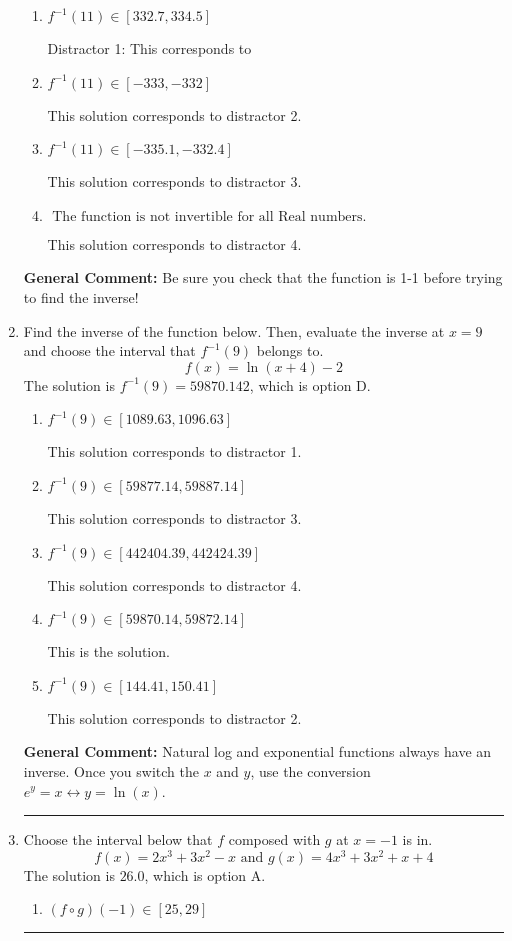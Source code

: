 \documentclass{extbook}[14pt]
\newcommand{\litem}[1]{\item #1

\rule{\textwidth}{0.4pt}}
\begin{document}
\begin{enumerate}
{\begin{enumerate}[label=\Alph*.]
* This is the correct solution.
\item \( f^{-1}(11) \in [332.7, 334.5] \)

 Distractor 1: This corresponds to 
\item \( f^{-1}(11) \in [-333, -332] \)

 This solution corresponds to distractor 2.
\item \( f^{-1}(11) \in [-335.1, -332.4] \)

 This solution corresponds to distractor 3.
\item \( \text{ The function is not invertible for all Real numbers. } \)

 This solution corresponds to distractor 4.
\end{enumerate}

\textbf{General Comment:} Be sure you check that the function is 1-1 before trying to find the inverse!
}
\litem{
Find the inverse of the function below. Then, evaluate the inverse at $x = 9$ and choose the interval that $f^{-1}(9)$ belongs to.
\[ f(x) = \ln{(x+4)}-2 \]The solution is \( f^{-1}(9) = 59870.142 \), which is option D.\begin{enumerate}[label=\Alph*.]
\item \( f^{-1}(9) \in [1089.63, 1096.63] \)

 This solution corresponds to distractor 1.
\item \( f^{-1}(9) \in [59877.14, 59887.14] \)

 This solution corresponds to distractor 3.
\item \( f^{-1}(9) \in [442404.39, 442424.39] \)

 This solution corresponds to distractor 4.
\item \( f^{-1}(9) \in [59870.14, 59872.14] \)

 This is the solution.
\item \( f^{-1}(9) \in [144.41, 150.41] \)

 This solution corresponds to distractor 2.
\end{enumerate}

\textbf{General Comment:} Natural log and exponential functions always have an inverse. Once you switch the $x$ and $y$, use the conversion $ e^y = x \leftrightarrow y=\ln(x)$.
}
\litem{
Choose the interval below that $f$ composed with $g$ at $x=-1$ is in.
\[ f(x) = 2x^{3} +3 x^{2} -x \text{ and } g(x) = 4x^{3} +3 x^{2} +x + 4 \]The solution is \( 26.0 \), which is option A.\begin{enumerate}[label=\Alph*.]
\item \( (f \circ g)(-1) \in [25, 29] \)


\end{enumerate}}
\end{enumerate}
\end{document}
